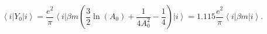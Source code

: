 \begin{equation}
\label{eq11}
\left\langle i\right|Y_0 \left| i \right\rangle =
\frac {e^2}\pi
\left\langle i \right| \beta m \left( \frac 32\ln(A_0) +
\frac 1{4A_0^2} - \frac 14\right)
\left| i \right\rangle = 1.115\frac{e^2}\pi
\left\langle i \right|\beta m\left| i \right\rangle.
\end{equation}

